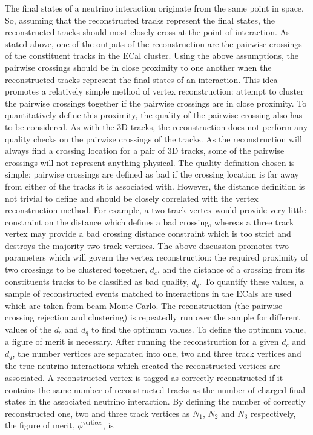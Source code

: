 \newline
\newline
The final states of a neutrino interaction originate from the same point in space.  So, assuming that the reconstructed tracks represent the final states, the reconstructed tracks should most closely cross at the point of interaction.  As stated above, one of the outputs of the reconstruction are the pairwise crossings of the constituent tracks in the ECal cluster.  Using the above assumptions,  the pairwise crossings should be in close proximity to one another when the reconstructed tracks represent the final states of an interaction.  This idea promotes a relatively simple method of vertex reconstruction: attempt to cluster the pairwise crossings together if the pairwise crossings are in close proximity.  To quantitatively define this proximity, the quality of the pairwise crossing also has to be considered.
\newline 
\newline
As with the 3D tracks, the reconstruction does not perform any quality checks on the pairwise crossings of the tracks.  As the reconstruction will always find a crossing location for a pair of 3D tracks, some of the pairwise crossings will not represent anything physical.  The quality definition chosen is simple: pairwise crossings are defined as bad if the crossing location is far away from either of the tracks it is associated with.  However, the distance definition is not trivial to define and should be closely correlated with the vertex reconstruction method.  For example, a two track vertex would provide very little constraint on the distance which defines a bad crossing, whereas a three track vertex may provide a bad crossing distance constraint which is too strict and destroys the majority two track vertices. 
\newline
\newline
The above discussion promotes two parameters which will govern the vertex reconstruction: the required proximity of two crossings to be clustered together, $d_c$, and the distance of a crossing from its constituents tracks to be classified as bad quality, $d_q$.  To quantify these values, a sample of reconstructed events matched to interactions in the ECals are used which are taken from beam Monte Carlo.  The reconstruction (the pairwise crossing rejection and clustering) is repeatedly run over the sample for different values of the $d_c$ and $d_q$ to find the optimum values.  To define the optimum value, a figure of merit is necessary.  After running the reconstruction for a given $d_c$ and $d_q$, the number vertices are separated into one, two and three track vertices and the true neutrino interactions which created the reconstructed vertices are associated.  A reconstructed vertex is tagged as correctly reconstructed if it contains the same number of reconstructed tracks as the number of charged final states in the associated neutrino interaction.  By defining the number of correctly reconstructed one, two and three track vertices as $N_1$, $N_2$ and $N_3$ respectively, the figure of merit, $\phi^{\textrm{vertices}}$, is
